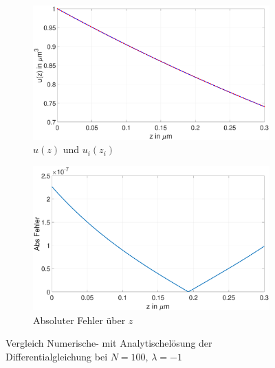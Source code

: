  \begin{figure}[p]
 	\begin{subfigure}[b]{0.5\textwidth}
 		\includegraphics[width=\textwidth]{figures/station_gl_2_1/test_n100}
		\caption{$u(z)$ und $u_{i}(z_i)$}
 	  \end{subfigure}
 	\hfill
 \begin{subfigure}[b]{0.5\textwidth}
 	\includegraphics[width=1\linewidth]{figures/station_gl_2_1/test_n100_fehler}
 	\caption{Absoluter Fehler über $z$}
  \end{subfigure}
\caption{Vergleich Numerische- mit Analytischelösung der Differentialgleichung bei $N=100,\,\lambda=-1$}
 	\label{fig:testn10}
 \end{figure}

